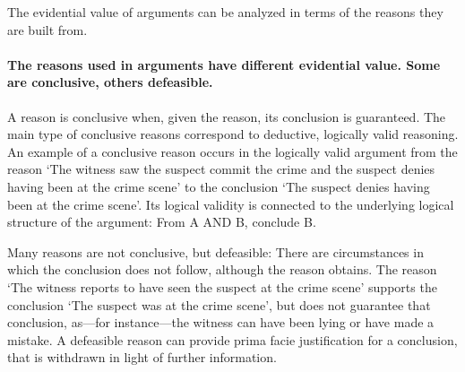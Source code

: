 \documentclass[10pt]{article}
\begin{document}
The evidential value of arguments can be analyzed in terms of the reasons they are built from.

\paragraph{The reasons used in arguments have different evidential value. Some are conclusive, others defeasible.} A reason is conclusive when, given  the reason, its conclusion is guaranteed. The main type of conclusive reasons correspond to deductive, logically valid reasoning. 
An example of a conclusive reason occurs in the logically valid argument from the reason `The witness saw the suspect commit the crime and the suspect denies having been at the crime scene' to the conclusion `The suspect denies having been at the crime scene'. Its logical validity is connected to the underlying logical structure of the argument: From A AND B, conclude B. 


Many reasons are not conclusive, but defeasible: There are circumstances in which the conclusion does not follow, although the reason obtains. The reason `The witness reports to have seen the suspect at the crime scene' supports the conclusion `The suspect was at the crime scene', but does not guarantee that conclusion, as---for instance---the witness can have been lying or have made a mistake. A defeasible reason can provide prima facie justification for a conclusion, that is withdrawn in light of further information.

\end{document}
